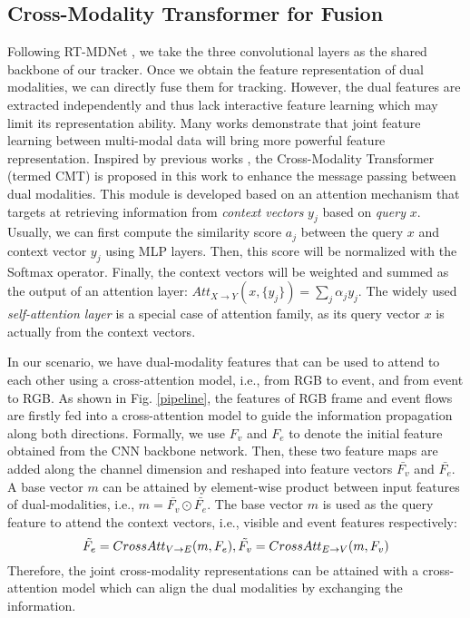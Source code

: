 \documentclass[journal]{IEEEtran}
\begin{document}
\subsection{Cross-Modality Transformer for Fusion}   \label{CMT}
Following RT-MDNet \cite{Jung_2018_ECCV}, we take the three convolutional layers as the shared backbone of our tracker. Once we obtain the feature representation of dual modalities, we can directly fuse them for tracking. However, the dual features are extracted independently and thus lack interactive feature learning which may limit its representation ability. Many works demonstrate that joint feature learning between multi-modal data will bring more powerful feature representation. Inspired by previous works \cite{vaswani2017attention, tan2019lxmert}, the Cross-Modality Transformer (termed CMT) is proposed in this work to enhance the message passing between dual modalities. This module is developed based on an attention mechanism that targets at retrieving information from \emph{context vectors} $y_j$ based on \emph{query} $x$. Usually, we can first compute the similarity score $a_j$ between the query $x$ and context vector $y_j$ using MLP layers. Then, this score will be normalized with the Softmax operator. Finally, the context vectors will be weighted and summed as the output of an attention layer: $Att_{X \rightarrow Y} (x, \{y_j\}) = \sum_{j} \alpha_j y_j$. The widely used \emph{self-attention layer} \cite{wang2018nonlocal} is a special case of attention family, as its query vector $x$ is actually from the context vectors. 





In our scenario, we have dual-modality features that can be used to attend to each other using a cross-attention model, i.e., from RGB to event, and from event to RGB. As shown in Fig. \ref{pipeline}, the features of RGB frame and event flows are firstly fed into a cross-attention model to guide the information propagation along both directions. Formally, we use $F_{v}$ and $F_{e}$ to denote the initial feature obtained from the CNN backbone network. Then, these two feature maps are added along the channel dimension and reshaped into feature vectors $\bar{F_{v}}$ and $\bar{F_{e}}$. A base vector $m$ can be attained by element-wise product between input features of dual-modalities, i.e., $m = \bar{F_{v}} \odot \bar{F_{e}}$. The base vector $m$ is used as the query feature to attend the context vectors, i.e., visible and event features respectively: 
\begin{equation}
\label{CrossAtt}
\small 
\tilde{F_e} = CrossAtt_{V \rightarrow E} (m, F_e), 	  \tilde{F_v} = CrossAtt_{E \rightarrow V} (m, F_v)
\end{equation}
Therefore, the joint cross-modality representations can be attained with a cross-attention model which can align the dual modalities by exchanging the information. 
\end{document}
